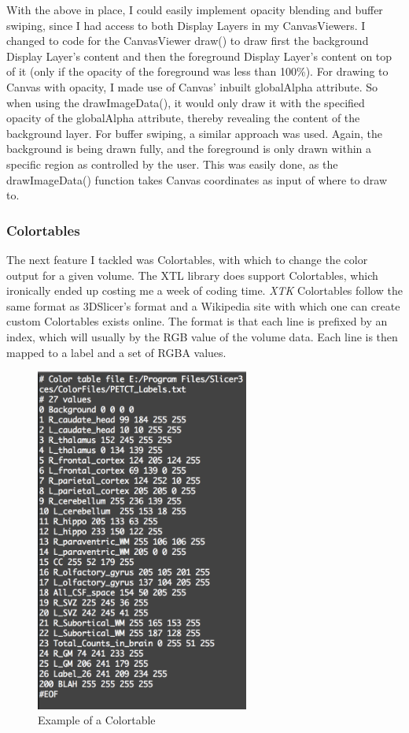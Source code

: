 \documentclass[a4paper,11pt,twoside]{article}
\begin{document}
With the above in place, I could easily implement opacity blending and buffer swiping, since I had access to both Display Layers in my CanvasViewers. I changed to code for the CanvasViewer draw() to draw first the background Display Layer's content and then the foreground Display Layer's content on top of it (only if the opacity of the foreground was less than 100\%). For drawing to Canvas with opacity, I made use of Canvas' inbuilt globalAlpha attribute. So when using the drawImageData(), it would only draw it with the specified opacity of the globalAlpha attribute, thereby revealing the content of the background layer. For buffer swiping, a similar approach was used. Again, the background is being drawn fully, and the foreground is only drawn within a specific region as controlled by the user. This was easily done, as the drawImageData() function takes Canvas coordinates as input of where to draw to. 




\subsubsection{Colortables}

The next feature I tackled was Colortables, with which to change the color output for a given volume. The XTL library does support Colortables, which ironically ended up costing me a week of coding time. \textit{XTK} Colortables follow the same format as 3DSlicer's format and a Wikipedia site with which one can create custom Colortables exists online. The format is that each line is prefixed by an index, which will usually by the RGB value of the volume data. Each line is then mapped to a label and a set of RGBA values.

\begin{figure}[ht!]
\centering
\includegraphics[width=70mm]{graphics/Colortable_01.png}
\caption{Example of a Colortable}
\label{fig:UIdesign1}
\end{figure}
\end{document}
